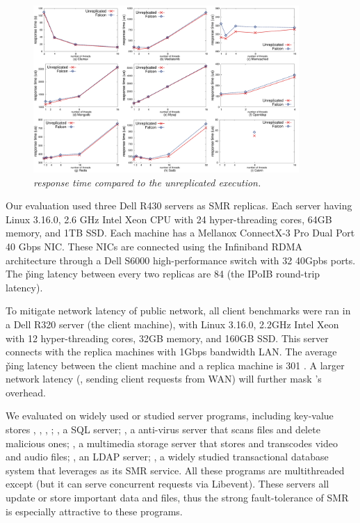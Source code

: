 \begin{figure}[t]
\centering
\includegraphics[width=0.9\textwidth]{figures/latency}
\vspace{-.10in}
\caption{\small {\em \xxx response time compared to the unreplicated 
execution.}}
\vspace{-.20in}
\label{fig:latency}
\end{figure}

Our evaluation used three Dell R430 servers as SMR replicas. Each server having 
Linux 3.16.0, 2.6 GHz Intel Xeon CPU with 24 hyper-threading cores, 64GB 
memory, and 1TB SSD. Each machine has a Mellanox ConnectX-3 Pro Dual Port 40 
Gbps NIC. These NICs are connected using the Infiniband RDMA architecture 
through a Dell S6000 high-performance switch with 32 40Gpbs ports. The \v{ping} 
latency between every two replicas are 84 \us (the IPoIB round-trip latency).

To mitigate network latency of public network, all client benchmarks were ran 
in a Dell R320 server (the client machine), with Linux 3.16.0, 2.2GHz Intel 
Xeon with 12 hyper-threading cores, 32GB memory, and 160GB SSD. This server 
connects with the replica machines with 1Gbps bandwidth LAN. The average 
\v{ping} latency between the client machine and a replica machine is 301 \us. A 
larger network latency (\eg, sending client requests from WAN) will further 
mask \xxx's overhead.

We evaluated \xxx on \nprog widely used or studied server programs, including 
\nkvprog key-value stores \redis, \memcached, \ssdb, \mongodb; \mysql, a SQL 
server; \clamav, a anti-virus server that scans files and delete malicious ones; 
\mediatomb, a multimedia storage server that stores and transcodes video and 
audio files; \openldap, an LDAP server; \calvin, a widely studied transactional 
database system that leverages \zookeeper as its SMR service. All these programs 
are multithreaded except \redis (but it can serve concurrent requests via 
Libevent). These servers all update or store important data and files, thus the 
strong fault-tolerance of SMR is especially attractive to these programs.

